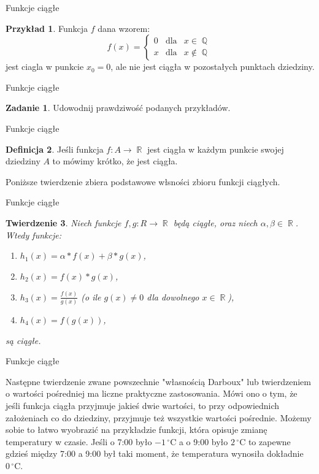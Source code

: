 \documentclass{beamer}
\newtheorem{tw}{Twierdzenie}[section]
\theoremstyle{definition}
\newtheorem{df}[tw]{Definicja}
\newtheorem{ex}[tw]{Przykład}
\newtheorem{zad}{Zadanie}
\DeclareMathOperator{\R}{\mathbb{R}}
\DeclareMathOperator{\Q}{\mathbb{Q}}
\begin{document}
\begin{frame}{Funkcje ciągłe}
	\begin{ex}
		Funkcja $f$ dana wzorem:\\
		\begin{displaymath} 
			f(x)= \left\{\begin{array}{lll}
			0 & \textrm{dla} & x \in \Q \\
			x & \textrm{dla} & x \notin \Q
			\end{array} \right.
 		\end{displaymath}
		jest ciagla w punkcie $x_0 = 0$, ale nie jest ciągła w pozostałych punktach dziedziny.\\
	\end{ex}
\end{frame}
\begin{frame}{Funkcje ciągłe}
	\begin{zad}
		Udowodnij prawdziwość podanych przykładów.\\
	\end{zad}
\end{frame}
\begin{frame}{Funkcje ciągłe}
	\begin{df}
		Jeśli funkcja $f:  A \rightarrow \R$ jest ciągła w każdym punkcie swojej dziedziny $A$ to mówimy krótko, że jest ciągła.


		Poniższe twierdzenie zbiera podstawowe włsności zbioru funkcji ciągłych.\\
	\end{df}
\end{frame}
\begin{frame}{Funkcje ciągłe}
	\begin{tw}
		Niech funkcje $f,g: R \rightarrow \R$ będą ciągłe, oraz niech $\alpha, \beta \in \R$.\\
		Wtedy funkcje:
		\begin{enumerate}
			\item[a)] $h_1(x)=\alpha*f(x)+\beta*g(x)$,
			\item[b)] $h_2(x)=f(x)*g(x)$,
			\item[c)] $h_3(x)=\frac{f(x)}{g(x)}$ (o ile $g(x)\neq0$ dla dowolnego $x\in \R$),
			\item[d)] $h_4(x)=f(g(x))$,
		\end{enumerate}
		są ciągłe.
	\end{tw}
\end{frame}
\begin{frame}{Funkcje ciągłe}

		Następne twierdzenie zwane powszechnie "własnością Darboux" lub twierdzeniem o wartości pośredniej ma liczne praktyczne zastosowania. Mówi ono o tym, że jeśli funkcja ciągła przyjmuje jakieś dwie wartości, to przy odpowiednich założeniach co do dziedziny, przyjmuje  też wszystkie wartości pośrednie. Możemy sobie to łatwo wyobrazić na przykładzie funkcji, która opisuje zmianę temperatury w czasie. Jeśli o 7:00 było $-1\,^{\circ}\mathrm{C}$ a o 9:00 było $2\,^{\circ}\mathrm{C}$ to zapewne gdzieś między 7:00 a 9:00 był taki moment, że temperatura wynosiła dokładnie $0\,^{\circ}\mathrm{C}$.

	
\end{frame}
\end{document}
